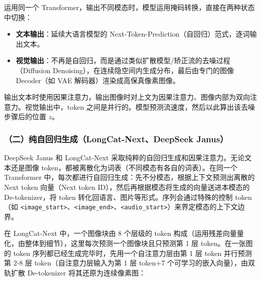 运用同一个 Transformer，输出不同模态时，模型运用掩码转换，直接在两种状态中切换：

\begin{itemize}
\tightlist
\item
  \textbf{文本输出}：延续大语言模型的 Next-Token-Prediction（自回归）范式，逐词输出文本。
\item
  \textbf{视觉输出}：不再是自回归，而是通过类似扩散模型/矫正流的去噪过程（Diffusion Denoising），在连续隐空间内生成分布，最后由专门的图像 Decoder（如 VAE 解码器）渲染成高保真像素图像。
\end{itemize}

输出文本时使用因果注意力，输出图像时对上文为因果注意力、图像内部为双向注意力。视觉输出中，token 之间是并行的。模型预测流速度，然后以此算出该去噪步骤后的位置 \(z\)。

\hypertarget{ux4e8cux7eafux81eaux56deux5f52ux751fux6210longcat-nextdeepseek-janus}{%
\subsubsection{（二）纯自回归生成（LongCat-Next、DeepSeek Janus）}\label{ux4e8cux7eafux81eaux56deux5f52ux751fux6210longcat-nextdeepseek-janus}}

DeepSeek Janus 和 LongCat-Next 采取纯粹的自回归生成和因果注意力。无论文本还是图像 token，都被离散化为词表（不同模态有各自的词表）。在同一个 Transformer 中，每次都进行自回归生成：先不分模态，根据上下文预测出离散的 Next token 向量（Next token ID），然后再根据模态将生成的向量送进本模态的 De-tokenizer，将 token 转化回语言、图片等形式。序列会通过特殊的控制 token（如 \texttt{\textless{}image\_start\textgreater{}}、\texttt{\textless{}image\_end\textgreater{}}、\texttt{\textless{}audio\_start\textgreater{}}）来界定模态的上下文边界。

在 LongCat-Next 中，一个图像块由 8 个层级的 token 构成（运用残差向量量化，由整体到细节），这里每次预测一个图像块且只预测第 1 层 token。在一张图的 token 序列都已经生成完毕时，先用一个自注意力层由第 1 层 token 并行预测第 2-8 层 token（自注意力层输入为第 1 层 token+7 个可学习的嵌入向量），由双轨扩散 De-tokenizer 将其还原为连续像素图：

